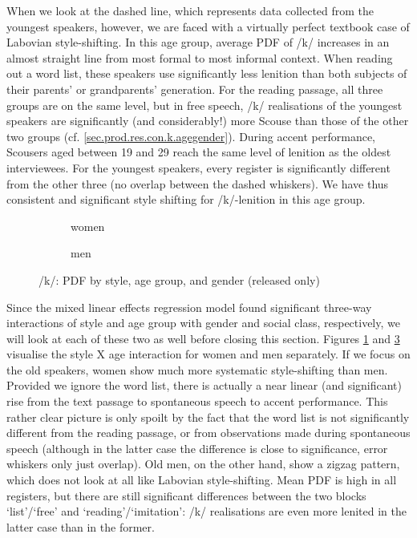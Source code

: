 When we look at the dashed line, which represents data collected from the youngest speakers, however, we are faced with a virtually perfect textbook case of Labovian style-shifting.
In this age group, average PDF of /k/ increases in an almost straight line from most formal to most informal context.
When reading out a word list, these speakers use significantly less lenition than both subjects of their parents' or grandparents' generation.
For the reading passage, all three groups are on the same level, but in free speech, /k/ realisations of the youngest speakers are significantly (and considerably!) more Scouse than those of the other two groups (cf. \ref{sec.prod.res.con.k.agegender}).
During accent performance, Scousers aged between 19 and 29 reach the same level of lenition as the oldest interviewees.
For the youngest speakers, every register is significantly different from the other three (no overlap between the dashed whiskers).
We have thus consistent and significant style shifting for /k/-lenition in this age group.

\begin{figure}[h]
	\centering
	\begin{subfigure}{.49\textwidth}
		\centering
			\resizebox{\linewidth}{!}{} 
		\caption{women}
		\label{fig.line.k.fem}
	\end{subfigure}
	\begin{subfigure}{.49\textwidth}
		\centering
			\resizebox{\linewidth}{!}{} 
		\caption{men}
		\label{fig.line.k.mal}
	\end{subfigure}
	\caption{/k/: PDF by style, age group, and gender (released only)}
\end{figure}

Since the mixed linear effects regression model found significant three-way interactions of style and age group with gender and social class, respectively, we will look at each of these two as well before closing this section.
Figures \ref{fig.line.k.fem} and \ref{fig.line.k.mal} visualise the style X age interaction for women and men separately.
If we focus on the old speakers, women show much more systematic style-shifting than men.
Provided we ignore the word list, there is actually a near linear (and significant) rise from the text passage to spontaneous speech to accent performance.
This rather clear picture is only spoilt by the fact that the word list is not significantly different from the reading passage, or from observations made during spontaneous speech (although in the latter case the difference is close to significance, error whiskers only just overlap).
Old men, on the other hand, show a zigzag pattern, which does not look at all like Labovian style-shifting.
Mean PDF is high in all registers, but there are still significant differences between the two blocks `list'/`free' and `reading'/`imitation': /k/ realisations are even more lenited in the latter case than in the former.

